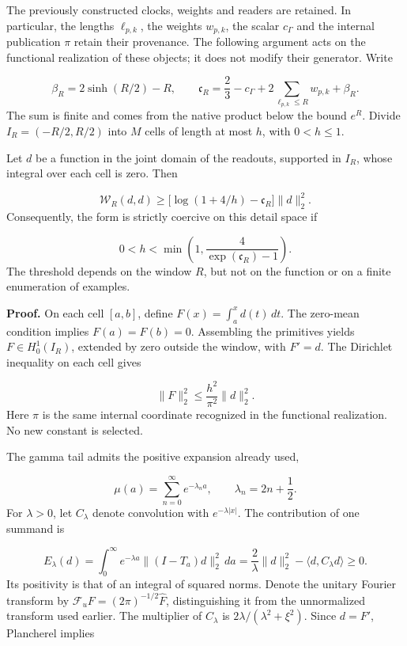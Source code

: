 The previously constructed clocks, weights and readers are retained. In particular, the lengths \(\ell_{p,k}\), the weights \(w_{p,k}\), the scalar \(c_\Gamma\) and the internal publication \(\pi\) retain their provenance. The following argument acts on the functional realization of these objects; it does not modify their generator. Write

\[
\beta_R=2\sinh(R/2)-R,\qquad
\mathfrak c_R=\frac23-c_\Gamma+
2\sum_{\ell_{p,k}\leq R}w_{p,k}+\beta_R.
\]
The sum is finite and comes from the native product below the bound \(e^R\). Divide \(I_R=(-R/2,R/2)\) into \(M\) cells of length at most \(h\), with \(0<h\leq1\).

Let \(d\) be a function in the joint domain of the readouts, supported in \(I_R\), whose integral over each cell is zero. Then

\[
\boxed{\mathscr W_R(d,d)\geq
\bigl[\log(1+4/h)-\mathfrak c_R\bigr]\|d\|_2^2.}
\]
Consequently, the form is strictly coercive on this detail space if

\[
0<h<\min\left(1,\frac4{\exp(\mathfrak c_R)-1}\right).
\]
The threshold depends on the window \(R\), but not on the function or on a finite enumeration of examples.

\textbf{Proof.} On each cell \([a,b]\), define \(F(x)=\int_a^x d(t)\,dt\). The zero-mean condition implies \(F(a)=F(b)=0\). Assembling the primitives yields \(F\in H_0^1(I_R)\), extended by zero outside the window, with \(F'=d\). The Dirichlet inequality on each cell gives

\[
\|F\|_2^2\leq\frac{h^2}{\pi^2}\|d\|_2^2.
\]
Here \(\pi\) is the same internal coordinate recognized in the functional realization. No new constant is selected.

The gamma tail admits the positive expansion already used,

\[
\mu(a)=\sum_{n=0}^{\infty}e^{-\lambda_n a},
\qquad \lambda_n=2n+\frac12.
\]
For \(\lambda>0\), let \(C_\lambda\) denote convolution with \(e^{-\lambda|x|}\). The contribution of one summand is

\[
E_\lambda(d)=\int_0^\infty e^{-\lambda a}
\|(I-T_a)d\|_2^2\,da
=\frac2\lambda\|d\|_2^2-
\langle d,C_\lambda d\rangle\geq0.
\]
Its positivity is that of an integral of squared norms. Denote the unitary Fourier transform by \(\mathcal F_u F=(2\pi)^{-1/2}\widehat F\), distinguishing it from the unnormalized transform used earlier. The multiplier of \(C_\lambda\) is \(2\lambda/(\lambda^2+\xi^2)\). Since \(d=F'\), Plancherel implies

